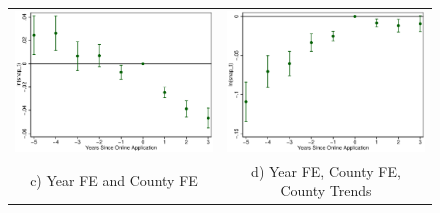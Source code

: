 \documentclass[11pt,letterpaper]{article}
\begin{document}
\begin{figure}
\begin{tabular}{cc}
\includegraphics[scale=0.57]{tabfig/evstu_snap_t_one_yrcf_5_3}&\includegraphics[scale=0.57]{tabfig/evstu_snap_t_one_yrcfsttr_5_3}\\
c) Year FE and County FE&d) Year FE, County FE, County Trends\\
\end{tabular}
\end{figure}
\end{document}
